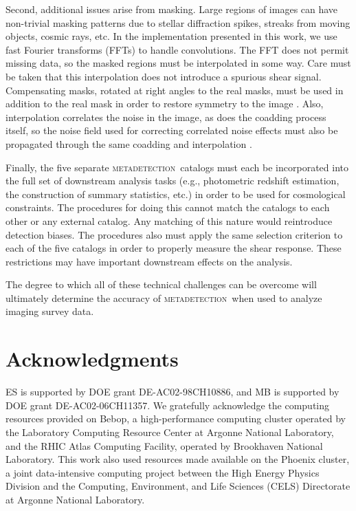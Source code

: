 \documentclass[iop, appendixfloats, numberedappendix, apj]{emulateapj}
\newcommand{\mdet}{\textsc{metadetection}}
\begin{document}
Second, additional issues arise from masking. Large regions of images can have
non-trivial masking patterns due to stellar diffraction spikes, streaks from
moving objects, cosmic rays, etc. In the implementation presented in this work,
we use fast Fourier transforms (FFTs) to handle convolutions. The FFT does not
permit missing data, so the masked regions must be interpolated in some way.
Care must be taken that this interpolation does not introduce a spurious shear
signal.  Compensating masks, rotated at right angles to the real masks, must be
used in addition to the real mask in order to restore symmetry to the image
\citep{SheldonMcal2017}.  Also, interpolation correlates the noise in the
image, as does the coadding process itself, so the noise field used for
correcting correlated noise effects must also be propagated through the same
coadding and interpolation \citep{SheldonMcal2017,ArmstrongCoadd}.

Finally, the five separate \mdet\ catalogs must each be incorporated into the
full set of downstream analysis tasks (e.g., photometric redshift estimation,
the construction of summary statistics, etc.) in order to be used for
cosmological constraints. The procedures for doing this cannot match the
catalogs to each other or any external catalog. Any matching of this nature would
reintroduce detection biases. The procedures also must apply the same
selection criterion to each of the five catalogs in order to properly measure
the shear response. These restrictions may have important downstream effects on
the analysis.

The degree to which all of these technical challenges can be overcome will
ultimately determine the accuracy of \mdet\ when used to analyze imaging survey
data.


\section*{Acknowledgments}

ES is supported by DOE grant DE-AC02-98CH10886, and MB is supported by DOE
grant DE-AC02-06CH11357.  We gratefully acknowledge the computing resources
provided on Bebop, a high-performance computing cluster operated by the
Laboratory Computing Resource Center at Argonne National Laboratory, and the
RHIC Atlas Computing Facility, operated by Brookhaven National Laboratory.
This work also used resources made available on the Phoenix cluster, a joint
data-intensive computing project between the High Energy Physics Division and
the Computing, Environment, and Life Sciences (CELS) Directorate at Argonne
National Laboratory.
\end{document}
